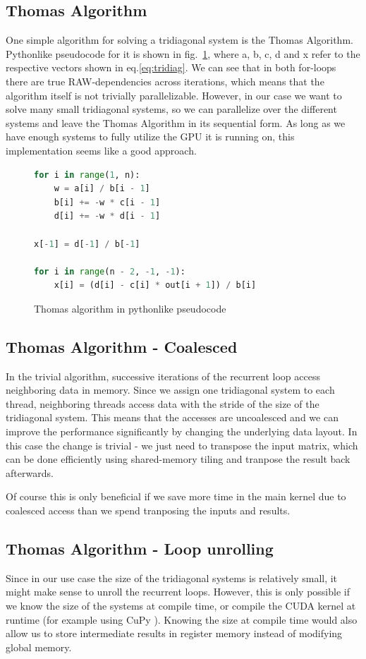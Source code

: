 \documentclass[a4paper,oneside]{memoir}
\begin{document}
\subsection{Thomas Algorithm}
One simple algorithm for solving a tridiagonal system is the Thomas Algorithm.
Pythonlike pseudocode for it is shown in fig.~\ref{fig:thomas}, where a, b, c, d and x refer to the respective vectors shown in eq.\ref{eq:tridiag}.
We can see that in both for-loops there are true RAW-dependencies across iterations, which means that the algorithm itself is not trivially parallelizable.
However, in our case we want to solve many small tridiagonal systems, so we can parallelize over the different systems and leave the Thomas Algorithm in its sequential form.
As long as we have enough systems to fully utilize the GPU it is running on, this implementation seems like a good approach.

\begin{figure}[hbtp]
    \caption{Thomas algorithm in pythonlike pseudocode}
    \label{fig:thomas}
    \begin{lstlisting}[language=python,frame=single]
for i in range(1, n):
    w = a[i] / b[i - 1]
    b[i] += -w * c[i - 1]
    d[i] += -w * d[i - 1]

x[-1] = d[-1] / b[-1]

for i in range(n - 2, -1, -1):
    x[i] = (d[i] - c[i] * out[i + 1]) / b[i]
    \end{lstlisting}
\end{figure}


\subsection{Thomas Algorithm - Coalesced}
\label{sec:thomas_coal}
In the trivial algorithm, successive iterations of the recurrent loop access neighboring data in memory.
Since we assign one tridiagonal system to each thread, neighboring threads access data with the stride of the size of the tridiagonal system. This means that the accesses are uncoalesced and we can improve the performance significantly by changing the underlying data layout. 
In this case the change is trivial - we just need to transpose the input matrix, which can be done efficiently using shared-memory tiling and tranpose the result back afterwards. 

Of course this is only beneficial if we save more time in the main kernel due to coalesced access than we spend tranposing the inputs and results.

\subsection{Thomas Algorithm - Loop unrolling}
Since in our use case the size of the tridiagonal systems is relatively small, it might make sense to unroll the recurrent loops. However, this is only possible if we know the size of the systems at compile time, or compile the CUDA kernel at runtime (for example using CuPy \cite{cupylearningsys2017}).
Knowing the size at compile time would also allow us to store intermediate results in register memory instead of modifying global memory.
\end{document}
